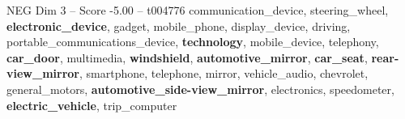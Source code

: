 \begin{textsample}{NEG Dim 3 – Score -5.00 – t004776}  \label{ex:f3_neg_031}
communication\_device, steering\_wheel, \textbf{electronic\_device}, gadget, mobile\_phone, display\_device, driving, portable\_communications\_device, \textbf{technology}, mobile\_device, telephony, \textbf{car\_door}, multimedia, \textbf{windshield}, \textbf{automotive\_mirror}, \textbf{car\_seat}, \textbf{rear-view\_mirror}, smartphone, telephone, mirror, vehicle\_audio, chevrolet, general\_motors, \textbf{automotive\_side-view\_mirror}, electronics, speedometer, \textbf{electric\_vehicle}, trip\_computer

\end{textsample}
